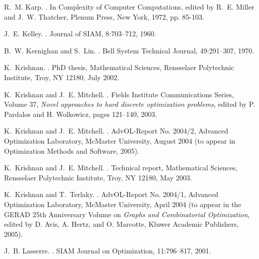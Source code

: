 \documentclass[12pt]{article}
\begin{document}
\begin{thebibliography}{10}
R.~M. Karp.
.
\newblock In Complexity of
  Computer Computations, edited by R.~E. Miller and J.~W. Thatcher,
  Plenum Press, New York, 1972, pp. 85-103.

J.~E. Kelley.
.
\newblock Journal of SIAM, 8:703--712, 1960.

B.~W. Kernighan and S.~Lin.
.
\newblock Bell System Technical Journal, 49:291--307, 1970.

K.~Krishnan.
.
\newblock PhD thesis, Mathematical Sciences, Rensselaer Polytechnic Institute,
  Troy, NY 12180, July 2002.

K.~Krishnan and J.~E. Mitchell.
.
\newblock Fields Institute Communications
  Series, Volume 37, {\em Novel approaches to hard discrete optimization
  problems}, edited by P. Pardalos and H. Wolkowicz, pages 121--140, 2003.

K.~Krishnan and J.~E. Mitchell.
.
\newblock AdvOL-Report No. 2004/2, Advanced Optimization
Laboratory, McMaster University, August 2004 (to appear in
Optimization Methods and Software, 2005).

K.~Krishnan and J.~E. Mitchell.
.
\newblock Technical report, Mathematical Sciences, Rensselaer Polytechnic
  Institute, Troy, NY 12180, May 2003.

K.~Krishnan and T.~Terlaky.
.
\newblock AdvOL-Report No. 2004/1, Advanced Optimization
Laboratory, McMaster University, April 2004 (to appear in the
GERAD 25th Anniversary Volume on {\em Graphs and Combinatorial
Optimization}, edited by D. Avis, A. Hertz, and O. Marcotte,
Kluwer Academic Publishers, 2005).

J.~B. Lasserre.
.
\newblock SIAM Journal on Optimization, 11:796--817, 2001.


\end{thebibliography}
\end{document}
